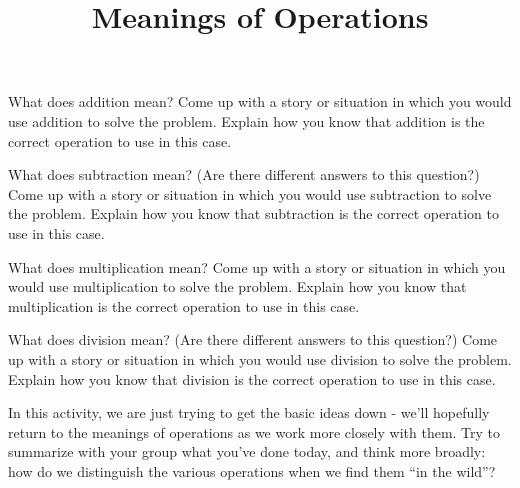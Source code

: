 \documentclass[handout,nooutcomes, noauthor]{ximera}
\title{Meanings of Operations}
\begin{document}
\begin{abstract}
\end{abstract}
\maketitle

\begin{question}
What does addition mean?  Come up with a story or situation in which you would use addition to solve the problem.  Explain how you know that addition is the correct operation to use in this case.
\end{question}

\begin{question}
What does subtraction mean? (Are there different answers to this question?)  Come up with a story or situation in which you would use subtraction to solve the problem.  Explain how you know that subtraction is the correct operation to use in this case.
\end{question}

\begin{question}
What does multiplication mean?  Come up with a story or situation in which you would use multiplication to solve the problem.  Explain how you know that multiplication is the correct operation to use in this case.
\end{question}

\begin{question}
What does division mean? (Are there different answers to this question?)  Come up with a story or situation in which you would use division to solve the problem.  Explain how you know that division is the correct operation to use in this case.
\end{question}

\begin{problem}
In this activity, we are just trying to get the basic ideas down - we'll hopefully return to the meanings of operations as we work more closely with them.  Try to summarize with your group what you've done today, and think more broadly: how do we distinguish the various operations when we find them ``in the wild''?
\end{problem}
\end{document}
